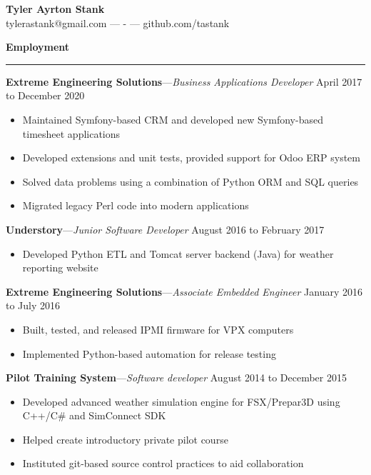 \documentclass[12pt,letterpaper]{article}
\newenvironment{details}{
    \vspace{-.8em}
    \begin{itemize}
        \renewcommand \labelitemi{\labelitemiv}
        \setlength{\itemsep}{0pt}
        \setlength{\parskip}{-1pt}
        \setlength{\parsep}{0pt}
    }{
    \end{itemize}
    \vspace{-.5em}
}
\newcommand{\hr} {
    \vspace{-1em}
    \par\rule{\textwidth}{1pt}
    \vspace{-1.5em}
}
\newcommand{\ressection}[1] {
    \par{\large \textbf{#1}}
    \hr
}
\newenvironment{employment} {
    \setlength{\parskip}{0pt}
    \ressection{Employment}
}{
    \vspace{0.5em}
}
\newcommand{\employer}[3] {
    \vspace{3pt}
    {\par\textbf{#1}---\textit{#2} \hfill #3}
    \vspace{3pt}
    \par
}
\begin{document}
\thispagestyle{empty}

\begin{centering}
    {\huge \textbf{Tyler Ayrton Stank}}\\
    tylerastank@gmail.com ---  - --- github.com/tastank\\
\end{centering}


\begin{employment} 

\employer{Extreme Engineering Solutions}{Business Applications Developer}{April 2017 to December 2020}
\begin{details}
    \item Maintained Symfony-based CRM and developed new Symfony-based timesheet applications
    \item Developed extensions and unit tests, provided support for Odoo ERP system
    \item Solved data problems using a combination of Python ORM and SQL queries
    \item Migrated legacy Perl code into modern applications
\end{details}

\employer{Understory}{Junior Software Developer}{August 2016 to February 2017}
\begin{details}
    \item Developed Python ETL and Tomcat server backend (Java) for weather reporting website
\end{details}

\employer{Extreme Engineering Solutions}{Associate Embedded Engineer}{January 2016 to July 2016}
\begin{details}
    \item Built, tested, and released IPMI firmware for VPX computers
    \item Implemented Python-based automation for release testing
\end{details}

\employer{Pilot Training System}{Software developer}{August 2014 to December 2015}
\begin{details}
    \item Developed advanced weather simulation engine for FSX/Prepar3D using C++/C\# and SimConnect SDK
    \item Helped create introductory private pilot course
    \item Instituted git-based source control practices to aid collaboration
\end{details}


\end{employment}
\end{document}
